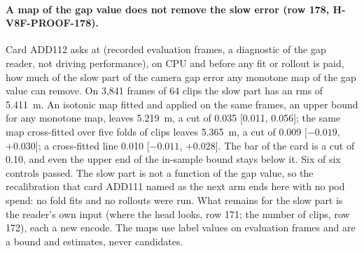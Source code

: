 \paragraph{A map of the gap value does not remove the slow error (row 178, H-V8F-PROOF-178).} Card ADD112 asks at  (recorded evaluation frames, a diagnostic of the gap reader, not driving performance), on CPU and before any fit or rollout is paid, how much of the slow part of the camera gap error any monotone map of the gap value can remove. On 3,841 frames of 64 clips the slow part has an rms of 5.411~m. An isotonic map fitted and applied on the same frames, an upper bound for any monotone map, leaves 5.219~m, a cut of 0.035 [0.011, 0.056]; the same map cross-fitted over five folds of clips leaves 5.365~m, a cut of 0.009 [$-0.019$, $+0.030$]; a cross-fitted line 0.010 [$-0.011$, $+0.028$]. The bar of the card is a cut of 0.10, and even the upper end of the in-sample bound stays below it. Six of six controls passed. The slow part is not a function of the gap value, so the recalibration that card ADD111 named as the next arm ends here with no pod spend: no fold fits and no rollouts were run. What remains for the slow part is the reader's own input (where the head looks, row 171; the number of clips, row 172), each a new encode. The maps use label values on evaluation frames and are a bound and estimates, never candidates.

